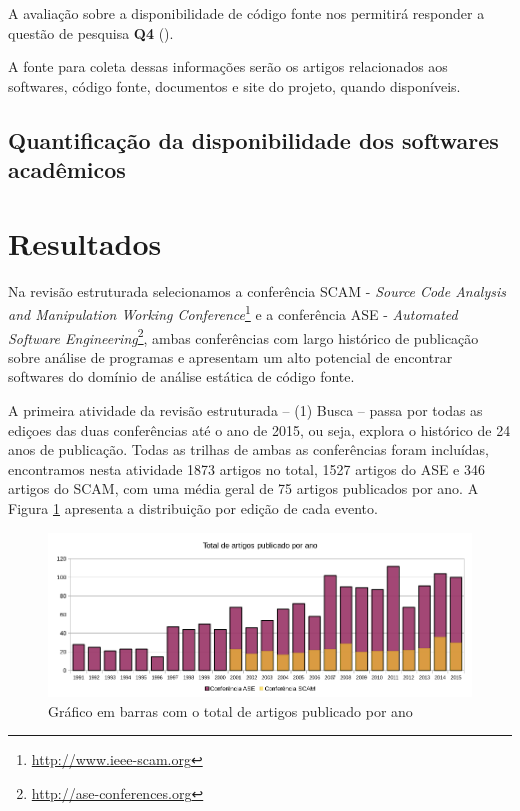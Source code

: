 A avaliação sobre a disponibilidade de código fonte nos permitirá responder a questão de pesquisa
{\bf Q4} (\QuestaoQuatro).

A fonte para coleta dessas informações serão os artigos relacionados aos
softwares, código fonte, documentos e site do projeto, quando disponíveis.

\subsection{Quantificação da disponibilidade dos softwares acadêmicos}

\section{Resultados}

Na revisão estruturada selecionamos a conferência SCAM - {\it
Source Code Analysis and Manipulation Working
Conference}\footnote{\url{http://www.ieee-scam.org}} e a conferência ASE - {\it
Automated Software Engineering}\footnote{\url{http://ase-conferences.org}},
ambas conferências com largo histórico de publicação sobre análise de
programas e apresentam um alto potencial de encontrar softwares do domínio de
análise estática de código fonte.

A primeira atividade da revisão estruturada -- (1) Busca -- passa por
todas as ediçoes das duas conferências até o ano de 2015, ou seja, explora o
histórico de 24 anos de publicação. Todas as trilhas de ambas as conferências
foram incluídas, encontramos nesta atividade 1873 artigos no total, 1527 artigos
do ASE e 346 artigos do SCAM, com uma média geral de 75 artigos publicados por ano. A
Figura \ref{artigos-por-ano} apresenta a distribuição por edição de cada
evento.

\begin{figure}[h]
  \center
  \includegraphics[scale=0.65]{imagens/artigos-por-ano.png}
  \caption{Gráfico em barras com o total de artigos publicado por ano}
  \label{artigos-por-ano}
\end{figure}

